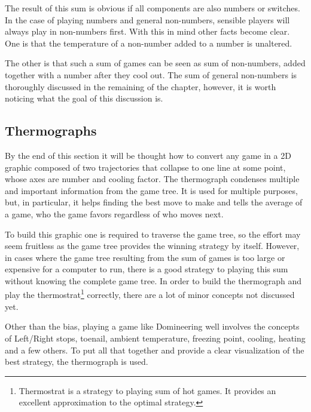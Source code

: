The result of this sum is obvious if all components are also numbers or switches. In the case of playing numbers and general non-numbers, sensible players will always play in non-numbers first. With this in mind other facts become clear. One is that the temperature of a non-number added to a number is unaltered.

The other is that such a sum of games can be seen as sum of non-numbers, added together with a number after they cool out. The sum of general non-numbers is thoroughly discussed in the remaining of the chapter, however, it is worth noticing what the goal of this discussion is.

\subsection*{Thermographs}

By the end of this section it will be thought how to convert any game in a 2D graphic composed of two trajectories that collapse to one line at some point, whose axes are number and cooling factor. The thermograph condenses multiple and important information from the game tree. It is used for multiple purposes, but, in particular, it helps finding the best move to make and tells the average of a game, who the game favors regardless of who moves next.

To build this graphic one is required to traverse the game tree, so the effort may seem fruitless as the game tree provides the winning strategy by itself. However, in cases where the game tree resulting from the sum of games is too large or expensive for a computer to run, there is a good strategy to playing this sum without knowing the complete game tree. In order to build the thermograph and play the thermostrat\footnote{Thermostrat is a strategy to playing sum of hot games. It provides an excellent approximation to the optimal strategy.} correctly, there are a lot of minor concepts not discussed yet.

Other than the bias, playing a game like Domineering well involves the concepts of Left/Right stops, toenail, ambient temperature, freezing point, cooling, heating and a few others. To put all that together and provide a clear visualization of the best strategy, the thermograph is used.


